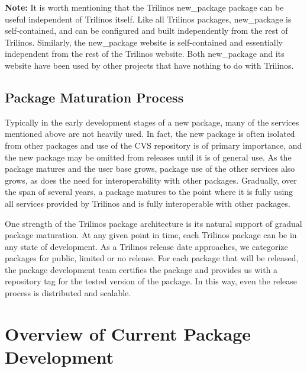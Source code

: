 \documentclass[acmtoms,acmnow]{acmtrans2m}
\begin{document}
{\bf Note:} It is worth mentioning that the Trilinos new\_package package can be
useful independent of Trilinos itself.  Like all Trilinos packages,
new\_package is self-contained, and can be configured and
built independently from the rest of Trilinos.  Similarly, the
new\_package website is self-contained and essentially independent
from the rest of the Trilinos website.  Both new\_package and its
website have been used by other projects that have nothing to do with Trilinos.

\subsection{Package Maturation Process}
Typically in the early development
stages of a new package, many of the services mentioned above are not
heavily used. In fact, the new package is often isolated from other
packages and use of the CVS repository is of primary importance, and the new
package may be omitted from releases until it is of general use.
As the package
matures and the user base grows, package use of the other services
also grows, as does the need for interoperability with other
packages.  Gradually, over the span of several years, a package
matures to the point where it is fully using all services provided by
Trilinos and is fully interoperable with other packages.

One strength of the Trilinos package architecture is its natural
support of gradual package maturation.  At any given point in time,
each Trilinos package can be in any state of development.  As a
Trilinos release date approaches, we categorize packages for public,
limited or no release.  For each package that will be released, the
package development team certifies the package and provides us with a
repository tag for the tested version of the package.  In this way,
even the release process is distributed and scalable.

\section{Overview of Current Package Development}
\label{sect:Software}
\end{document}

